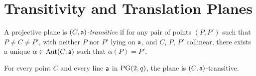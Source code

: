 \section{Transitivity and Translation Planes}

\begin{defn}\label{defn:(C,a)-transitive}
    A projective plane is \textsl{$(C,\mathsf{a})$-transitive} if for any pair of points $(P,P')$ such that $P \ne C \ne P'$, with neither $P$ nor $P'$ lying on $\mathsf{a}$, and $C$, $P$, $P'$ collinear, there exists a unique $\alpha \in \operatorname{Aut}(C,\mathsf{a})$ such that $\alpha(P) = P'$.
\end{defn}

\begin{thm}\label{thm:PG(2,q)-transitivity}
    For every point\/ $C$ and every line\/ $\mathsf a$ in\/ $\operatorname{PG}(2,q)$, the plane is\/ $(C,\mathsf a)$-transitive.
\end{thm}


